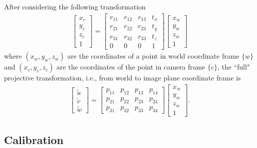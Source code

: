 \documentclass{report}
\begin{document}
After considering the following transformation
\begin{align}
	\begin{bmatrix}
		x_c \\
		y_c \\
		z_c \\
		1
	\end{bmatrix}
	=
	\begin{bmatrix}
		r_{11} & r_{12} & r_{13} & t_x \\
		r_{21} & r_{22} & r_{23} & t_y \\
		r_{31} & r_{32} & r_{33} & t_z \\
		0 & 0 & 0 & 1
	\end{bmatrix}
	\begin{bmatrix}
		x_w \\
		y_w \\
		z_w \\
		1
	\end{bmatrix}
	\label{eqn:WorldToCamera}
\end{align}
where $(x_w, y_w, z_w)$ are the coordinates of a point in world coordinate frame $\{w\}$ and $(x_c, y_c, z_c)$ are the coordinates of the point in camera frame $\{c\}$, the ``full" projective transformation, i.e., from world to image plane coordinate frame is
\begin{align}
	\begin{bmatrix}
		\tilde{u} \\
		\tilde{v} \\
		\tilde{w}
	\end{bmatrix}
	=
	\begin{bmatrix}
		p_{11} & p_{12} & p_{13} & p_{14} \\
		p_{21} & p_{22} & p_{23} & p_{24} \\
		p_{31} & p_{32} & p_{33} & p_{34}
	\end{bmatrix}
	\begin{bmatrix}
		x_w \\
		y_w \\
		z_w \\
		1
	\end{bmatrix}.
	\label{eqn:WorldToImage}
\end{align}


\subsection{Calibration}
\end{document}

